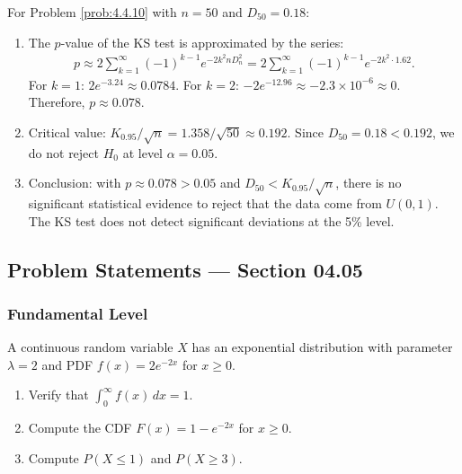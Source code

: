 \begin{solucion}
	\label{sol:4.4.10}
	For Problem \ref{prob:4.4.10} with $n = 50$ and $D_{50} = 0.18$:
	\begin{enumerate}
		\item The $p$-value of the KS test is approximated by the series:
		\begin{align*}
			p \approx 2 \sum_{k=1}^{\infty}(-1)^{k-1} e^{-2k^{2} n D_{n}^{2}} = 2 \sum_{k=1}^{\infty}(-1)^{k-1} e^{-2k^{2} \cdot 1.62}.
		\end{align*}
		For $k=1$: $2 e^{-3.24} \approx 0.0784$. For $k=2$: $-2 e^{-12.96} \approx -2.3 \times 10^{-6} \approx 0$. Therefore, $p \approx 0.078$.
		\item Critical value: $K_{0.95}/\sqrt{n} = 1.358/\sqrt{50} \approx 0.192$. Since $D_{50} = 0.18 < 0.192$, we do not reject $H_{0}$ at level $\alpha = 0.05$.
		\item Conclusion: with $p \approx 0.078 > 0.05$ and $D_{50} < K_{0.95}/\sqrt{n}$, there is no significant statistical evidence to reject that the data come from $U(0, 1)$. The KS test does not detect significant deviations at the 5\% level. \quad \qedhere
	\end{enumerate}
\end{solucion}


\subsection*{Problem Statements --- Section 04.05}

\subsubsection*{Fundamental Level}

\begin{problema}
	\label{prob:4.5.1}
	A continuous random variable $X$ has an exponential distribution with parameter $\lambda = 2$ and PDF $f(x) = 2e^{-2x}$ for $x \ge 0$.
	\begin{enumerate}
		\item Verify that $\int_{0}^{\infty} f(x)\,dx = 1$.
		\item Compute the CDF $F(x) = 1 - e^{-2x}$ for $x \ge 0$.
		\item Compute $P(X \le 1)$ and $P(X \ge 3)$.
	\end{enumerate}
\end{problema}

